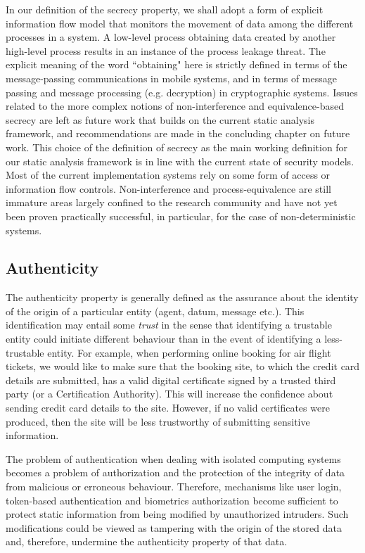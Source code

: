 \documentclass[10pt,a4paper,final,oneside,fleqn]{book}
\begin{document}
In our definition of the secrecy property, we shall adopt a form of explicit information flow model that monitors the movement of data among the different processes in a system.  A low-level process obtaining data created by another high-level process results in an instance of the process leakage threat.  The explicit meaning of the word ``obtaining" here is strictly defined in terms of the message-passing communications in mobile systems, and in terms of message passing and message processing (e.g. decryption) in cryptographic systems.  Issues related to the more complex notions of non-interference and equivalence-based secrecy are left as future work that builds on the current static analysis framework, and recommendations are made in the concluding chapter on future work. This choice of the definition of secrecy as the main working definition for our static analysis framework is in line with the current state of security models.  Most of the current implementation systems rely on some form of access or information flow controls.  Non-interference and process-equivalence are still immature areas largely confined to the research community and have not yet been proven practically successful, in particular, for the case of non-deterministic systems.
\subsection{Authenticity}
The authenticity property is generally defined as the assurance about the identity of the origin of a particular entity (agent, datum, message etc.).  This identification may entail some {\itshape trust\/} in the sense that identifying a trustable entity could initiate different behaviour than in the event of identifying a less-trustable entity.  For example, when performing online booking for air flight tickets, we would like to make sure that the booking site, to which the credit card details are submitted, has a valid digital certificate signed by a trusted third party (or a Certification Authority).  This will increase the confidence about sending credit card details to the site.  However, if no valid certificates were produced, then the site will be less trustworthy of submitting sensitive information.

The problem of authentication when dealing with isolated computing systems becomes a problem of authorization and the protection of the integrity of data from malicious or erroneous behaviour.  Therefore, mechanisms like user login, token-based authentication and biometrics authorization become sufficient to protect static information from being modified by unauthorized intruders.  Such modifications could be viewed as tampering with the origin of the stored data and, therefore, undermine the authenticity property of that data.
\end{document}
